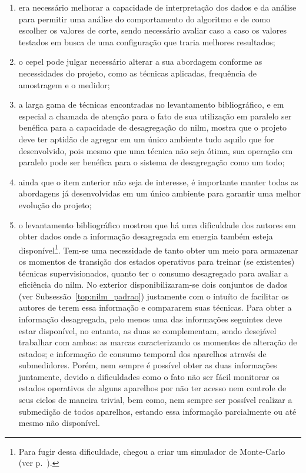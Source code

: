 \begin{enumerate}[label={Item} \arabic* - ,ref=\arabic*,align=left]
\item\label{itm:dif1} era necessário melhorar a capacidade de
interpretação dos dados e da análise para permitir uma análise do
comportamento do algoritmo e de como escolher os valores de corte,
sendo necessário avaliar caso a caso os valores testados em busca de
uma configuração que traria melhores resultados;
\item\label{itm:dif2} o \acs{cepel} pode julgar necessário alterar a
sua abordagem conforme as necessidades do projeto, como as técnicas
aplicadas, frequência de amostragem e o medidor;
\item\label{itm:dif3} a larga gama de técnicas encontradas no
levantamento bibliográfico, e em especial a chamada de atenção para o
fato de sua utilização em paralelo ser benéfica para a capacidade de
desagregação do \gls{nilm}, mostra que o projeto deve ter aptidão de
agregar em um único ambiente tudo aquilo que for desenvolvido, pois
mesmo que uma técnica não seja ótima, sua operação em paralelo pode
ser benéfica para o sistema de desagregação como um todo;
\item\label{itm:dif4} ainda que o item anterior não seja de interesse,
é importante manter todas as abordagens já desenvolvidas em um único
ambiente para garantir uma melhor evolução do projeto;
\item\label{itm:dif5} o levantamento bibliográfico mostrou que há uma
dificuldade dos autores em obter dados onde a informação desagregada
em energia também esteja disponível\footnote{Para fugir dessa
dificuldade, \cite{nilm_liang_pt2_2010_40} chegou a criar um simulador
de Monte-Carlo (ver p.~\pageref{nilm:multiplas_tecnicas}).}. Tem-se uma
necessidade de tanto obter um meio para armazenar os momentos de
transição dos estados operativos para treinar (se existentes) técnicas
supervisionados, quanto ter o consumo desagregado para avaliar a
eficiência do \gls{nilm}. No exterior disponibilizaram-se dois
conjuntos de dados (ver Subsessão~\ref{top:nilm_padrao}) justamente
com o intuíto de facilitar os autores de terem essa informação e
compararem suas técnicas.  Para obter a informação desagregada, pelo
menos uma das informações seguintes deve estar disponível, no entanto,
as duas se complementam, sendo desejável trabalhar com ambas: as
marcas caracterizando os momentos de alteração de estados;
e informação de consumo temporal dos aparelhos através de submedidores.
Porém, nem sempre é possível obter as duas informações juntamente,
devido a dificuldades como o fato não ser fácil monitorar os estados
operativos de alguns aparelhos por não ter acesso nem controle de seus
ciclos de maneira trivial, bem como, nem sempre ser possível realizar a
submedição de todos aparelhos, estando essa informação parcialmente ou
até mesmo não disponível.
\end{enumerate}

